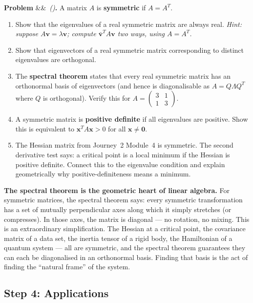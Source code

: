 \documentclass[12pt, a4paper]{article}
\newcounter{problem}
\newenvironment{problem}[1][]{\refstepcounter{problem}\par\vspace{6pt}\noindent\textbf{\color{MidBlue}Problem \theproblem}\ifx&#1&\else\ \textit{(#1)}\fi\textbf{.}\enskip}{\par\vspace{4pt}}
\begin{document}
\begin{problem}
\label{prob:spectral}
A matrix $A$ is \textbf{symmetric} if $A = A^T$.
\begin{enumerate}[label=(\alph*), topsep=2pt]
  \item Show that the eigenvalues of a real symmetric matrix are always real. \textit{Hint: suppose $A\mathbf{v} = \lambda\mathbf{v}$; compute $\bar{\mathbf{v}}^T A\mathbf{v}$ two ways, using $A = A^T$.}
  \item Show that eigenvectors of a real symmetric matrix corresponding to distinct eigenvalues are orthogonal.
  \item The \textbf{spectral theorem} states that every real symmetric matrix has an orthonormal basis of eigenvectors (and hence is diagonalisable as $A = Q\Lambda Q^T$ where $Q$ is orthogonal). Verify this for $A = \begin{pmatrix}3&1\\1&3\end{pmatrix}$.
  \item A symmetric matrix is \textbf{positive definite} if all eigenvalues are positive. Show this is equivalent to $\mathbf{x}^T A\mathbf{x} > 0$ for all $\mathbf{x} \neq \mathbf{0}$.
  \item The Hessian matrix from Journey~2 Module~4 is symmetric. The second derivative test says: a critical point is a local minimum if the Hessian is positive definite. Connect this to the eigenvalue condition and explain geometrically why positive-definiteness means a minimum.
\end{enumerate}
\end{problem}

\begin{thought}
\textbf{The spectral theorem is the geometric heart of linear algebra.}
For symmetric matrices, the spectral theorem says: every symmetric transformation has a set of mutually perpendicular axes along which it simply stretches (or compresses). In those axes, the matrix is diagonal --- no rotation, no mixing. This is an extraordinary simplification. The Hessian at a critical point, the covariance matrix of a data set, the inertia tensor of a rigid body, the Hamiltonian of a quantum system --- all are symmetric, and the spectral theorem guarantees they can each be diagonalised in an orthonormal basis. Finding that basis is the act of finding the ``natural frame'' of the system.
\end{thought}

\subsection{Step 4: Applications}
\end{document}
